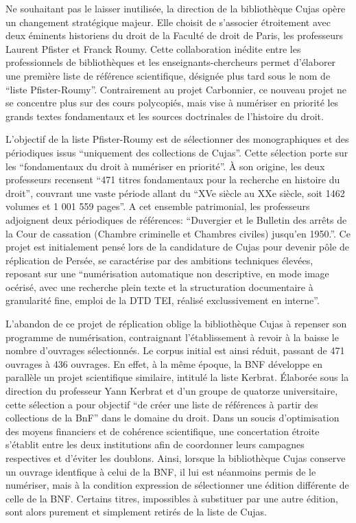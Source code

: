 Ne souhaitant pas le laisser inutilisée, la direction de la bibliothèque Cujas opère un changement stratégique majeur. Elle choisit de s'associer étroitement avec deux éminents  historiens du droit de la Faculté de droit de Paris, les professeurs Laurent Pfister et Franck Roumy. Cette collaboration inédite entre les professionnels de bibliothèques et les enseignants-chercheurs permet d'élaborer une première liste de référence scientifique, désignée plus tard sous le nom de \enquote{liste Pfister-Roumy}. Contrairement au projet Carbonnier, ce nouveau projet ne se concentre plus sur des cours polycopiés, mais vise à numériser en priorité  les grands textes fondamentaux et les sources doctrinales de l'histoire du droit.

L'objectif de la liste Pfister-Roumy est de sélectionner des monographiques et des périodiques issus \enquote{uniquement des collections de Cujas}. Cette sélection porte sur les \enquote{fondamentaux du droit à numériser en priorité}. À son origine, les deux professeurs recensent \enquote{471 titres fondamentaux pour la recherche en histoire du droit}, couvrant une vaste période allant du \enquote{XVe siècle au XXe siècle, soit 1462 volumes et 1 001 559 pages}. A cet ensemble patrimonial, les professeurs adjoignent deux périodiques de références: \enquote{Duvergier et le Bulletin des arrêts de la Cour de cassation (Chambre criminelle et Chambres civiles) jusqu'en 1950.}. Ce projet est initialement pensé lors de la candidature de Cujas pour devenir pôle de réplication de Persée, se caractérise par des ambitions techniques élevées, reposant sur une \enquote{numérisation automatique non descriptive, en mode image océrisé, avec une recherche plein texte et la structuration documentaire à granularité fine, emploi de la DTD TEI, réalisé exclussivement en interne}. 

L'abandon de ce projet de réplication oblige la bibliothèque Cujas à repenser son programme de numérisation, contraignant l'établissement à revoir à la baisse le nombre d'ouvrages sélectionnés. Le corpus initial est ainsi réduit, passant de 471 ouvrages à 436 ouvrages. En effet, à la même époque, la BNF développe en parallèle un projet scientifique similaire, intitulé la liste Kerbrat. Élaborée sous la direction du professeur Yann Kerbrat et d'un groupe de quatorze universitaire, cette sélection a pour objectif \enquote{de créer une liste de références à partir des collections de la BnF} dans le domaine du droit. Dans un soucis d'optimisation des moyens financiers et de cohérence scientifique, une concertation étroite s'établit entre les deux institutions afin de coordonner leurs campagnes respectives et d'éviter les doublons. Ainsi, lorsque la bibliothèque Cujas conserve un ouvrage identfique à celui de la BNF, il lui est néanmoins permis de le numériser, mais à la condition expression de sélectionner une édition différente de celle de la BNF. Certains titres, impossibles à substituer par une autre édition, sont alors purement et simplement retirés de la liste de Cujas. 

